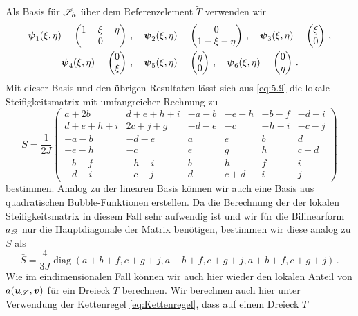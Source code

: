 Als Basis für $\mathscr S_h$ über dem Referenzelement $\widetilde T$ verwenden wir
\begin{align*}
	 \boldsymbol \psi_1(\xi,\eta) = \begin{pmatrix} 1-\xi-\eta \\ 0 \end{pmatrix}  \, , \quad \boldsymbol \psi_2(\xi,\eta) & = \begin{pmatrix} 0 \\ 1-\xi-\eta  \end{pmatrix} \, , \quad \boldsymbol \psi_3(\xi,\eta) = \begin{pmatrix} \xi \\ 0 \end{pmatrix}  \, , \\
	  \boldsymbol \psi_4(\xi,\eta)  = \begin{pmatrix} 0 \\ \xi  \end{pmatrix} \, , \quad
	 \boldsymbol \psi_5(\xi,\eta) & = \begin{pmatrix} \eta \\ 0\end{pmatrix}  \, , \quad  \boldsymbol \psi_6(\xi,\eta)  = \begin{pmatrix} 0 \\  \eta  \end{pmatrix}\, .
\end{align*}
Mit dieser Basis und den übrigen Resultaten lässt sich aus \eqref{eq:5.9} die lokale Steifigkeitsmatrix mit umfangreicher Rechnung zu
\[
	S = \frac 1{2J} \begin{pmatrix}
					a+ 2b & d+e+h+i & -a-b & -e-h & -b-f & -d-i \\
					d+e+h+i & 2c+j+g &  -d-e & -c & -h-i & -c-j \\
					-a-b & -d-e & a & e & b & d \\
					-e-h & -c & e & g & h & c+d \\
					-b-f & -h-i & b & h & f & i \\
					-d-i & -c-j & d & c+d & i & j
				\end{pmatrix}
\]
bestimmen. Analog zu der linearen Basis können wir auch eine Basis aus quadratischen Bubble-Funktionen erstellen. Da die Berechnung der der lokalen Steifigkeitsmatrix in diesem Fall sehr aufwendig ist und wir für die Bilinearform $a_{\mathscr Q}$ nur die Hauptdiagonale der Matrix benötigen, bestimmen wir diese analog zu $S$ als
\[
	\bar S =\frac 4{3J} \operatorname{diag} (a+b+f, c+g+j, a+b+f, c+g+j, a+b+f, c+g+j) \, .
\]
Wie im eindimensionalen Fall können wir auch hier wieder den lokalen Anteil von $a(\boldsymbol u_{\mathscr S},\boldsymbol v)$ für ein Dreieck $T$ berechnen. Wir berechnen auch hier unter Verwendung der Kettenregel \eqref{eq:Kettenregel}, dass auf einem Dreieck $T$
